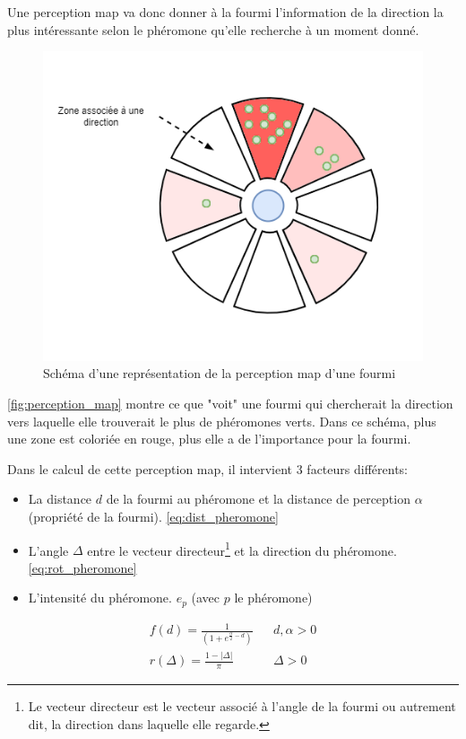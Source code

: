 \documentclass{EPUProjetDi}
\begin{document}
Une perception map va donc donner à la fourmi l'information de la direction la plus intéressante selon le phéromone qu'elle recherche à un moment donné.

\begin{figure}[h]
    \centering
    \includegraphics[scale=0.5]{perceptionmap.png}
    \caption{Schéma d'une représentation de la perception map d'une fourmi}
    \label{fig:perception_map}
\end{figure}

\autoref{fig:perception_map} montre ce que "voit" une fourmi qui chercherait la direction vers laquelle elle trouverait le plus de phéromones verts.
Dans ce schéma, plus une zone est coloriée en rouge, plus elle a de l'importance pour la fourmi.


Dans le calcul de cette perception map, il intervient 3 facteurs différents:
\begin{itemize}
    \item La distance $d$ de la fourmi au phéromone et la distance de perception $\alpha$ (propriété de la fourmi). \eqref{eq:dist_pheromone}
    \item L'angle $\Delta$ entre le vecteur directeur\footnote{Le vecteur directeur est le vecteur associé à l'angle de la fourmi ou
    autrement dit, la direction dans laquelle elle regarde.} et la direction du phéromone. \eqref{eq:rot_pheromone}
    \item L'intensité du phéromone. $e_p$ (avec $p$ le phéromone)
\end{itemize}

\begin{subequations}
\begin{align}
    f(d)=\frac{1}{(1 + e^{\frac{\alpha}{2} - d})} && d,\alpha > 0 \label{eq:dist_pheromone}\\
    r(\Delta)= \frac{1-\left\lvert \Delta\right\rvert}{\pi} && \Delta \label{eq:rot_pheromone}> 0
\end{align}
\end{subequations}
\end{document}
